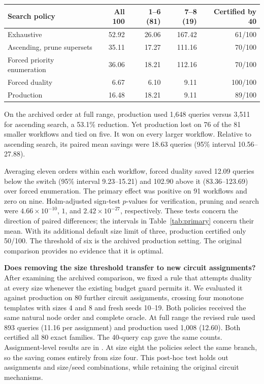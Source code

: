 \documentclass[11pt,letterpaper]{article}
\begin{document}
\begin{center}\begin{minipage}{\linewidth}\centering
{}\label{tab:cost}
\small\begin{tabular}{lrrrr}
\toprule
Search policy & All 100 & 1--6 (81) & 7--8 (19) & Certified by 40 \\
\midrule
Exhaustive & 52.92 & 26.06 & 167.42 & 61/100 \\
Ascending, prune supersets & 35.11 & 17.27 & 111.16 & 70/100 \\
Forced priority enumeration & 36.06 & 18.21 & 112.16 & 70/100 \\
Forced duality & 6.67 & 6.10 & 9.11 & 100/100 \\
Production & 16.48 & 18.21 & 9.11 & 89/100 \\
\bottomrule\end{tabular}
\end{minipage}\end{center}

On the archived order at full range, production used 1,648 queries versus 3,511 for ascending search, a 53.1\% reduction. Yet production lost on 76 of the 81 smaller workflows and tied on five. It won on every larger workflow. Relative to ascending search, its paired mean savings were 18.63 queries (95\% interval 10.56--27.88).

Averaging eleven orders within each workflow, forced duality saved 12.09 queries below the switch (95\% interval 9.23--15.21) and 102.90 above it (83.36--123.69) over forced enumeration. The primary effect was positive on 91 workflows and zero on nine. Holm-adjusted sign-test $p$-values for verification, pruning and search were $4.66\times10^{-10}$, $1$, and $2.42\times10^{-27}$, respectively. These tests concern the direction of paired differences; the intervals in Table~\ref{tab:primary} concern their mean. With its additional default size limit of three, production certified only 50/100. The threshold of six is the archived production setting. The original comparison provides no evidence that it is optimal.

\textbf{Does removing the size threshold transfer to new circuit assignments?} After examining the archived comparison, we fixed a rule that attempts duality at every size whenever the existing budget guard permits it. We evaluated it against production on 80 further circuit assignments, crossing four monotone templates with sizes 4 and 8 and fresh seeds 10--19. Both policies received the same natural node order and complete oracle. At full range the revised rule used 893 queries (11.16 per assignment) and production used 1,008 (12.60). Both certified all 80 exact families. The 40-query cap gave the same counts. Assignment-level results are in . At size eight the policies select the same branch, so the saving comes entirely from size four. This post-hoc test holds out assignments and size/seed combinations, while retaining the original circuit mechanisms.
\end{document}
